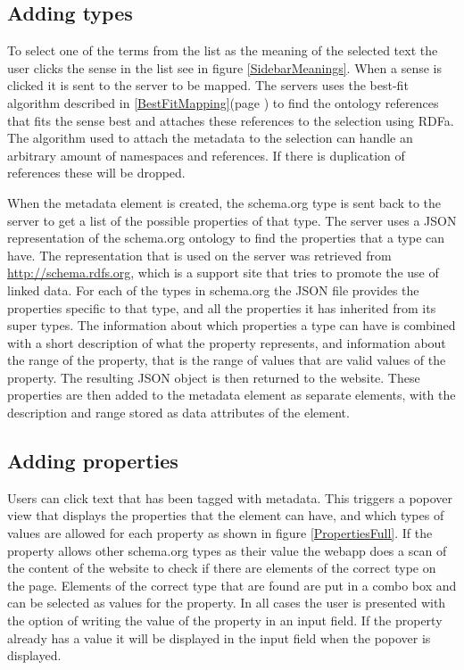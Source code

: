 \subsection{Adding types}

To select one of the terms from the list as the meaning of the selected text the user clicks the sense in the list see in
figure \ref{SidebarMeanings}.
When a sense is clicked it is sent to the server to be mapped.
The servers uses the best-fit algorithm described in \ref{BestFitMapping}(page \pageref{BestFitMapping}) to find the ontology references
that fits the sense best and attaches these references to the selection using RDFa.
The algorithm used to attach the metadata to the selection can handle an arbitrary amount of namespaces and references.
If there is duplication of references these will be dropped.

When the metadata element is created,
the schema.org type is sent back to the server to get a list of the possible properties of that type.
The server uses a JSON representation of the schema.org ontology to find the properties that a type can have.
The representation that is used on the server was retrieved from \url{http://schema.rdfs.org},
which is a support site that tries to promote the use of linked data.
For each of the types in schema.org the JSON file provides the properties specific to that type,
and all the properties it has inherited from its super types.
The information about which properties a type can have is combined with a short description of what the property represents,
and information about the range of the property, that is the range of values that are valid values of the property.
The resulting JSON object is then returned to the website.
These properties are then added to the metadata element as separate elements,
with the description and range stored as data attributes of the element.

\subsection{Adding properties}

Users can click text that has been tagged with metadata.
This triggers a popover view that displays the properties that the element can have,
and which types of values are allowed for each property as shown in figure \ref{PropertiesFull}.
If the property allows other schema.org types as their value the webapp does a scan of the content of the website to check if
there are elements of the correct type on the page.
Elements of the correct type that are found are put in a combo box and can be selected as values for the property.
In all cases the user is presented with the option of writing the value of the property in an input field.
If the property already has a value it will be displayed in the input field when the popover is displayed.

